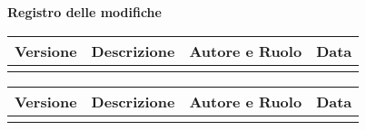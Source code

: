 \newpage
\begin{center}
	\Large{\textbf{Registro delle modifiche}}
	\\\vspace{0.5cm}
	\normalsize
	\begin{tabularx}{\textwidth}{cXcc}
		\textbf{Versione} & \textbf{Descrizione} & \textbf{Autore e Ruolo} & \textbf{Data} \\\toprule
		\modificheuno
		\bottomrule
	\end{tabularx}
	\newpage
	\begin{tabularx}{\textwidth}{cXcc}
		\textbf{Versione} & \textbf{Descrizione} & \textbf{Autore e Ruolo} & \textbf{Data} \\\toprule
		\modifichedue
		\bottomrule
	\end{tabularx}	
\end{center}
\newpage